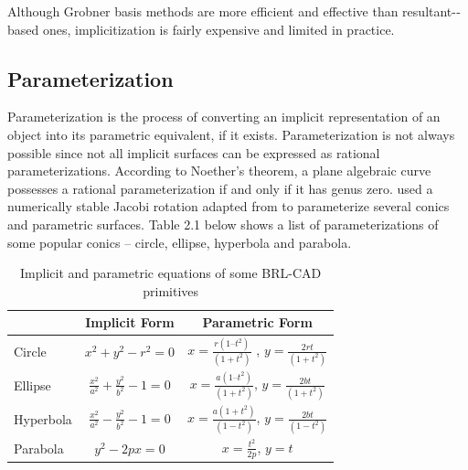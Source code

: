 Although Grobner basis methods are more efficient and effective than
resultant-­based ones, implicitization is fairly expensive and limited in practice.  




\subsection{Parameterization}

Parameterization is the process of converting an implicit representation of 
an object into its parametric equivalent, if it exists. Parameterization is not
always possible since not all implicit surfaces can be expressed as rational
parameterizations. According to Noether's theorem, a plane algebraic curve
possesses a rational parameterization if and only if it has genus zero. \cite{13} used
a numerically stable Jacobi rotation adapted from \cite{12} to parameterize several
conics and parametric surfaces. Table 2.1 below shows a list of
parameterizations of some popular conics – circle, ellipse, hyperbola and
parabola.
\begin{table}[thbp]
\caption[Implicit and parametric equations of some BRL-­CAD primitives]{Implicit and parametric equations of some BRL­-CAD primitives}
\centering
\begin{tabular}{| l | c | c |}
  \hline
   & Implicit Form & Parametric Form &  \\
  \hline
  Circle & $x^2 + y^2 - r^2 = 0$ &    $x =  \frac{r(1 – t^2)}{(1 + t^2)}$ , $y = \frac{2rt}{(1 + t^2)}$ \\
  \hline
  Ellipse & $\frac{x^2}{a^2} + \frac{y^2}{b^2} - 1 = 0$ &     $x = \frac{a(1 – t^2)}{(1 + t^2)}$, $y = \frac{2bt}{(1 + t^2)}$ \\
  \hline
  Hyperbola & $\frac{x^2}{a^2} - \frac{y^2}{b^2} - 1 = 0$ &     $x = \frac{a(1 + t^2)}{(1 - t^2)}$, $y = \frac{2bt}{(1 - t^2)}$ \\
  \hline
  Parabola & $y^2 - 2px = 0$ &     $ x = \frac{t^2}{2p}$, $ y = t$ \\
  \hline
\end{tabular}
\label{Implicit and Parametric equations}
\end{table}

